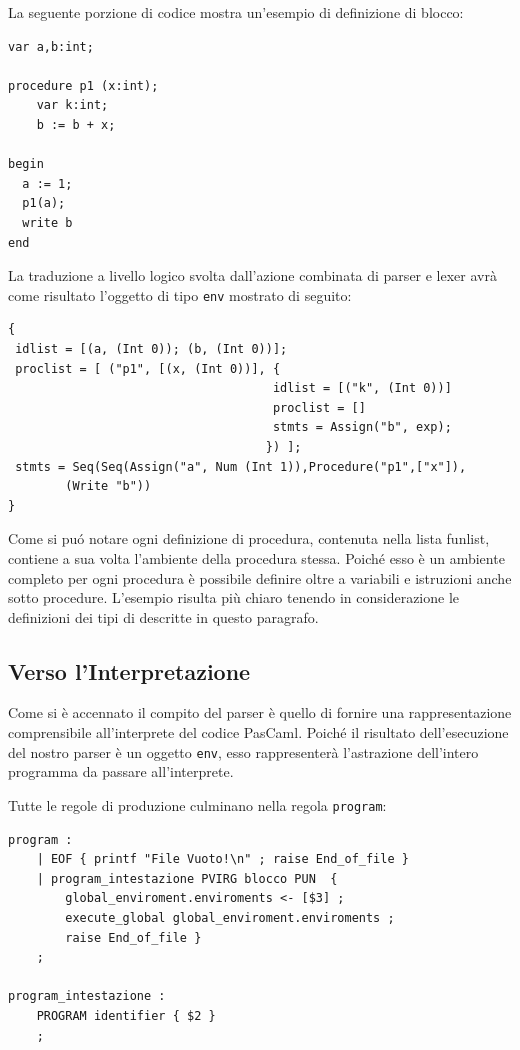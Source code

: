 \documentclass[a4paper,10pt]{article}
\begin{document}
La seguente porzione di codice mostra un'esempio di definizione di blocco:
\begin{verbatim}
var a,b:int;

procedure p1 (x:int);
    var k:int;
    b := b + x;

begin
  a := 1;
  p1(a);
  write b
end
\end{verbatim}

La traduzione a livello logico svolta dall'azione combinata di parser e lexer
avr\`a come risultato l'oggetto di tipo \texttt{env} mostrato di seguito:
\begin{verbatim}
{
 idlist = [(a, (Int 0)); (b, (Int 0))];
 proclist = [ ("p1", [(x, (Int 0))], {
                                     idlist = [("k", (Int 0))]
                                     proclist = []
                                     stmts = Assign("b", exp);
                                    }) ];
 stmts = Seq(Seq(Assign("a", Num (Int 1)),Procedure("p1",["x"]),
        (Write "b"))
}
\end{verbatim}

Come si pu\'o notare ogni definizione di procedura, contenuta nella lista
funlist, contiene a sua volta l'ambiente della procedura stessa.
Poich\'e esso \`e un ambiente completo per ogni procedura \`e possibile
definire oltre a variabili e istruzioni anche sotto procedure. L'esempio
risulta pi\`u chiaro tenendo in considerazione le definizioni dei tipi di
descritte in questo paragrafo.

\subsection{Verso l'Interpretazione}
Come si \`e accennato il compito del parser \`e quello di fornire una
rappresentazione comprensibile all'interprete del codice PasCaml. Poich\'e il
risultato dell'esecuzione del nostro parser \`e un oggetto \texttt{env}, esso
rappresenter\`a l'astrazione dell'intero programma da passare all'interprete.

Tutte le regole di produzione culminano nella regola \texttt{program}:

\begin{verbatim}
program :
    | EOF { printf "File Vuoto!\n" ; raise End_of_file }
    | program_intestazione PVIRG blocco PUN  { 
        global_enviroment.enviroments <- [$3] ;
        execute_global global_enviroment.enviroments ;
        raise End_of_file }
    ;

program_intestazione :
    PROGRAM identifier { $2 }
    ;

\end{verbatim}
\end{document}
